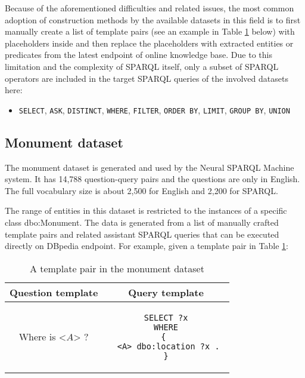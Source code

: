 Because of the aforementioned difficulties and related issues, the most common adoption of construction methods by the available datasets in this field is to first manually create a list of template pairs (see an example in Table \ref{table:template pair} below) with placeholders inside and then replace the placeholders with extracted entities or predicates from the latest endpoint of online knowledge base. Due to this limitation and the complexity of SPARQL itself, only a subset of SPARQL operators are included in the target SPARQL queries of the involved datasets here:
\begin{itemize}
\item \texttt{SELECT}, \texttt{ASK}, \texttt{DISTINCT}, \texttt{WHERE}, \texttt{FILTER}, \texttt{ORDER BY}, \texttt{LIMIT}, \texttt{GROUP BY}, \texttt{UNION}
\end{itemize}

\subsection{Monument dataset} \label{subsection:monument dataset}

The monument dataset is generated and used by the Neural SPARQL Machine \cite{Soru2018a} system. It has 14,788 question-query pairs and the questions are only in English. The full vocabulary size is about 2,500 for English and 2,200 for SPARQL.

The range of entities in this dataset is restricted to the instances of a specific class dbo:Monument. The data is generated from a list of manually crafted template pairs and related assistant SPARQL queries that can be executed directly on DBpedia endpoint. For example, given a template pair in Table \ref{table:template pair}:
\begin{table}[H]
\centering
\caption{A template pair in the monument dataset}
\label{table:template pair}
\begin{tabular}{c|c}
Question template & Query template \\
\hline
Where is <$ A $> ? & \begin{lstlisting}[language=SPARQL]
SELECT ?x
WHERE
{ 
  <A> dbo:location ?x . 
}
\end{lstlisting}
\end{tabular}
\end{table}

